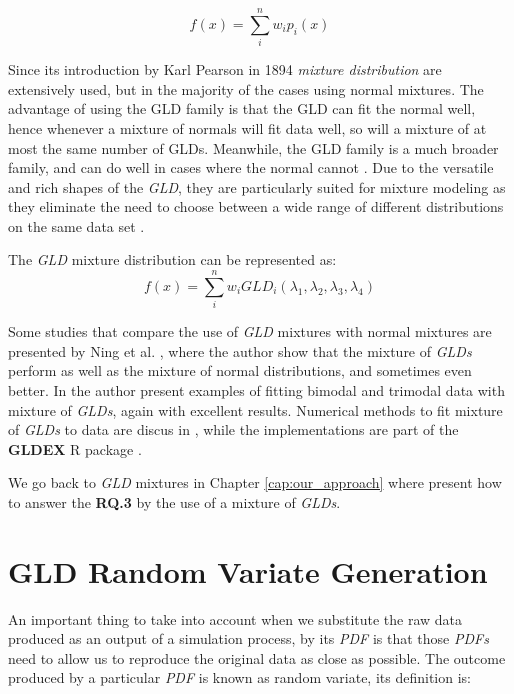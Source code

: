 \begin{equation}
f(x)=\sum_{i}^n w_{i}p_{i}(x)
\end{equation}

Since its introduction by Karl Pearson in 1894 \textit{mixture distribution} are extensively used, but in the majority of the cases using normal mixtures. The advantage of using the GLD family is that the GLD can fit the normal well, hence whenever a mixture of normals will fit data well, so will a mixture of at most the same number of GLDs. Meanwhile, the GLD family is a much broader family, and can do well in cases where the normal cannot \cite{Ning2008}. Due to the versatile and rich shapes of the \textit{GLD}, they are particularly suited for mixture modeling as they eliminate the need to choose between a wide range of different distributions on the same data set \cite{Su2007}.

The \textit{GLD} mixture distribution can be represented as:
\begin{equation}
f(x)=\sum_{i}^n w_{i}GLD_{i}(\lambda_{1},\lambda_{2},\lambda_{3},\lambda_{4})
\end{equation}

Some studies that compare the use of \textit{GLD} mixtures with normal mixtures are presented by Ning et al. \cite{Ning2008}, where the author show that the mixture of \textit{GLDs} perform as well as the mixture of normal distributions, and sometimes even better. In \cite{Su2011} the author present examples of fitting bimodal and trimodal data with mixture of \textit{GLDs}, again with excellent results. Numerical methods to fit mixture of \textit{GLDs} to data are discus in \cite{Su2007, Su2011}, while the implementations are part of the \textbf{GLDEX} R package \cite{Su2007}.

We go back to \textit{GLD} mixtures in Chapter \ref{cap:our_approach} where present how to answer the \textbf{RQ.3} by the use of a mixture of \textit{GLDs}.

\section{GLD Random Variate Generation}\label{sec:gld_random_variate}
An important thing to take into account when we substitute the raw data produced as an output of a simulation process, by its \textit{PDF} is that those \textit{PDFs} need to allow us to reproduce the original data as close as possible. The outcome produced by a particular \textit{PDF} is known as random variate, its definition is:

